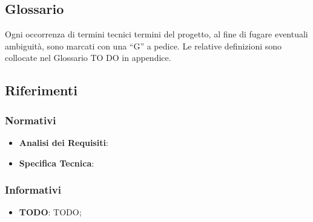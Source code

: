 	\subsection{Glossario} %
	\label{sub:glossario}
	Ogni occorrenza di termini tecnici termini del progetto, al fine di fugare eventuali ambiguità, sono marcati con una “G” a pedice. Le relative definizioni sono collocate nel Glossario TO DO in appendice.

	\subsection{Riferimenti} %
	\label{sub:riferimenti}
		\subsubsection{Normativi} %
		\label{ssub:normativi}
			\begin{itemize}
				\item \textbf{Analisi dei Requisiti}: \docNameVersionAdR
				\item \textbf{Specifica Tecnica}: \docNameVersionST
			\end{itemize}

		\subsubsection{Informativi} %
		\label{ssub:informativi}
			\begin{itemize}
				\item \textbf{TODO}: TODO;
			\end{itemize}
